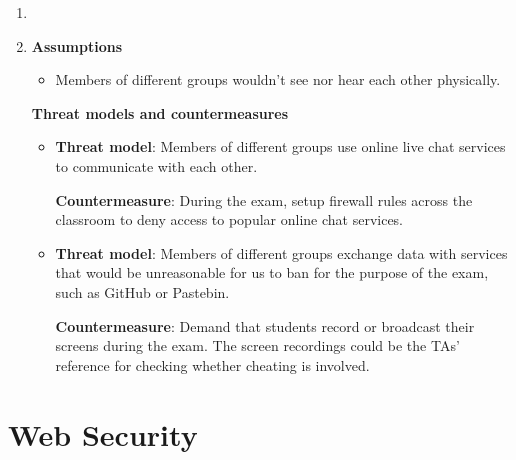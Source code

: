\documentclass[12pt, a4paper]{article}
\begin{document}
\begin{enumerate}[label=(\alph*)]
    \item

    \item \textbf{Assumptions}
    \begin{itemize}
      \item Members of different groups wouldn't see nor hear each other physically.
    \end{itemize}

    \textbf{Threat models and countermeasures}
    \begin{itemize}
      \item \textbf{Threat model}: Members of different groups use online
      live chat services to communicate with each other.

      \textbf{Countermeasure}: During the exam, setup firewall rules across
      the classroom to deny access to popular online chat services.

      \item \textbf{Threat model}: Members of different groups exchange data
      with services that would be unreasonable for us to ban for the purpose
      of the exam, such as GitHub or Pastebin.

      \textbf{Countermeasure}: Demand that students record or broadcast their
      screens during the exam. The screen recordings could be the TAs' reference
      for checking whether cheating is involved.
    \end{itemize}
  \end{enumerate}

  \pagebreak
  \section{Web Security}
\end{document}
